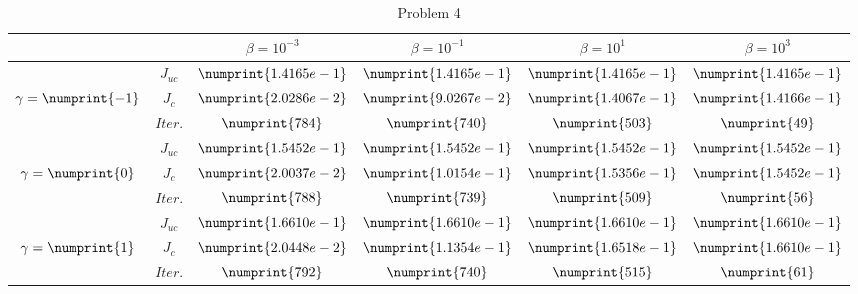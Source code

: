 \begin{table}
\begin{tabular}{ ||c|| c | c | c | c | c ||}
\hline
& & $\beta = 10^{-3}$ & $\beta = 10^{-1}$ & $\beta = 10^{1}$ & $\beta = 10^{3}$  \\
\hline
 & $J_{uc}$ & $\numprint{1.4165e-1}$ & $\numprint{1.4165e-1}$ & $\numprint{1.4165e-1}$ & $\numprint{1.4165e-1}$ \\
$\gamma= \numprint{-1}$  & $J_c$ & $\numprint{2.0286e-2}$ & $\numprint{9.0267e-2}$ & $\numprint{1.4067e-1}$ & $\numprint{1.4166e-1}$ \\
& $Iter.$ & $\numprint{784}$ & $\numprint{740}$ & $\numprint{503}$ & $\numprint{49}$ \\
\hline
 & $J_{uc}$ & $\numprint{1.5452e-1}$ & $\numprint{1.5452e-1}$ & $\numprint{1.5452e-1}$ & $\numprint{1.5452e-1}$ \\
$\gamma= \numprint{0}$  & $J_c$ & $\numprint{2.0037e-2}$ & $\numprint{1.0154e-1}$ & $\numprint{1.5356e-1}$ & $\numprint{1.5452e-1}$ \\
& $Iter.$ & $\numprint{788}$ & $\numprint{739}$ & $\numprint{509}$ & $\numprint{56}$ \\
\hline
 & $J_{uc}$ & $\numprint{1.6610e-1}$ & $\numprint{1.6610e-1}$ & $\numprint{1.6610e-1}$ & $\numprint{1.6610e-1}$ \\
$\gamma= \numprint{1}$  & $J_c$ & $\numprint{2.0448e-2}$ & $\numprint{1.1354e-1}$ & $\numprint{1.6518e-1}$ & $\numprint{1.6610e-1}$ \\
& $Iter.$ & $\numprint{792}$ & $\numprint{740}$ & $\numprint{515}$ & $\numprint{61}$ \\
\hline
\end{tabular}
\caption{Problem 4}
\label{TabS5:Prob4}
\end{table}